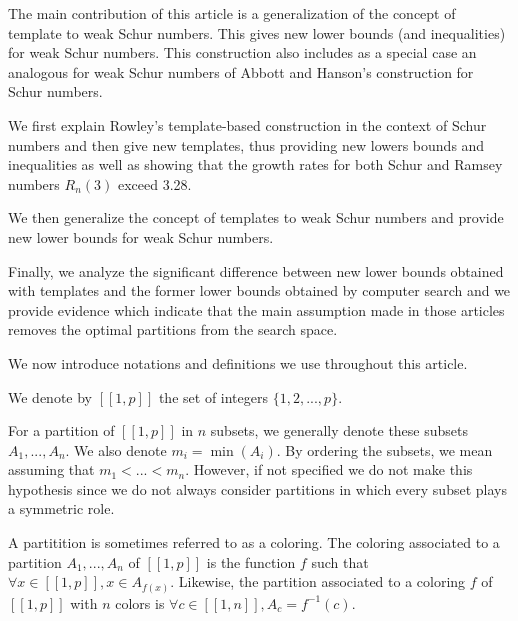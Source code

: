 \par
The main contribution of this article is a generalization of the concept of template to weak Schur numbers. 
This gives new lower bounds (and inequalities) for weak Schur numbers. This construction also includes as a 
special case an analogous for weak Schur numbers of Abbott and Hanson's construction for Schur numbers.

\par
We first explain Rowley's template-based construction in the context of Schur numbers and then give 
new templates, thus providing new lowers bounds and inequalities as well as showing that the growth rates 
for both Schur and Ramsey numbers \(R_n(3)\) exceed 3.28. 

\par
We then  generalize the concept of templates to weak Schur numbers and provide new lower bounds for weak 
Schur numbers. 

\par
Finally, we analyze the significant difference between new lower bounds obtained with templates and the former 
lower bounds obtained by computer search and we provide evidence which indicate that the main assumption 
made in those articles removes the optimal partitions from the search space.

\par
We now introduce notations and definitions we use throughout this article.

\begin{notation}
We denote by \([\![1,p]\!]\) the set of integers \(\{1, 2, ..., p\}\).
\end{notation}

\begin{notation}
For a partition of \([\![1, p]\!]\) in \(n\) subsets, we generally denote these subsets \(A_1, ..., A_n\). We 
also denote \(m_i = \min(A_i)\).
By ordering the subsets, we mean assuming that \(m_1 < ... < m_n\). However, if not specified we do not 
make this hypothesis since we do not always consider partitions in which every subset plays a symmetric role.
\end{notation}

\begin{definition}
A partitition is sometimes referred to as a coloring. The coloring associated to a partition \(A_1, ..., A_n\) of
\([\![1, p]\!]\) is the function \(f\) such that \(\forall x \in [\![1, p]\!], x \in A_{f(x)}\). Likewise, the partition 
associated to a coloring \(f\) of \([\![1, p]\!]\) with \(n\) colors is \(\forall c \in [\![1, n]\!], A_c = f^{-1}(c)\).
\end{definition}
